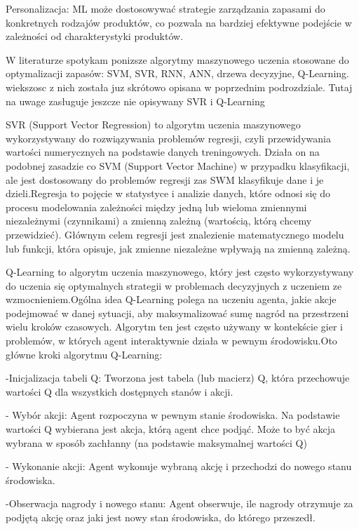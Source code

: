 Personalizacja: ML może dostosowywać strategie zarządzania zapasami do konkretnych rodzajów produktów, co pozwala na bardziej efektywne podejście w zależności od charakterystyki produktów.
\cite{linn2023}\cite{cdp2023}\cite{Matti2023}\cite{Had2023}

W literaturze spotykam ponizsze algorytmy maszynowego uczenia stosowane do optymalizacji zapasów:
SVM, SVR, RNN, ANN, drzewa decyzyjne, Q-Learning. wiekszosc z nich została juz skrótowo opisana w poprzednim podrozdziale. Tutaj na uwage zasługuje jeszcze nie opisywany SVR i Q-Learning

SVR (Support Vector Regression) to algorytm uczenia maszynowego wykorzystywany do rozwiązywania problemów regresji, czyli przewidywania wartości numerycznych na podstawie danych treningowych. Działa on na podobnej zasadzie co SVM (Support Vector Machine) w przypadku klasyfikacji, ale jest dostosowany do problemów regresji zas SWM klasyfikuje dane i je dzieli.Regresja to pojęcie w statystyce i analizie danych, które odnosi się do procesu modelowania zależności między jedną lub wieloma zmiennymi niezależnymi (czynnikami) a zmienną zależną (wartością, którą chcemy przewidzieć). Głównym celem regresji jest znalezienie matematycznego modelu lub funkcji, która opisuje, jak zmienne niezależne wpływają na zmienną zależną.

Q-Learning to algorytm uczenia maszynowego, który jest często wykorzystywany do uczenia się optymalnych strategii w problemach decyzyjnych z uczeniem ze wzmocnieniem.Ogólna idea Q-Learning polega na uczeniu agenta, jakie akcje podejmować w danej sytuacji, aby maksymalizować sumę nagród na przestrzeni wielu kroków czasowych. Algorytm ten jest często używany w kontekście gier i problemów, w których agent interaktywnie działa w pewnym środowisku.Oto główne kroki algorytmu Q-Learning: 

-Inicjalizacja tabeli Q: Tworzona jest tabela (lub macierz) Q, która przechowuje wartości Q dla wszystkich dostępnych stanów i akcji.

- Wybór akcji: Agent rozpoczyna w pewnym stanie środowiska. Na podstawie wartości Q wybierana jest akcja, którą agent chce podjąć. Może to być akcja wybrana w sposób zachłanny (na podstawie maksymalnej wartości Q) 

- Wykonanie akcji: Agent wykonuje wybraną akcję i przechodzi do nowego stanu środowiska.

-Obserwacja nagrody i nowego stanu: Agent obserwuje, ile nagrody otrzymuje za podjętą akcję oraz jaki jest nowy stan środowiska, do którego przeszedł.

